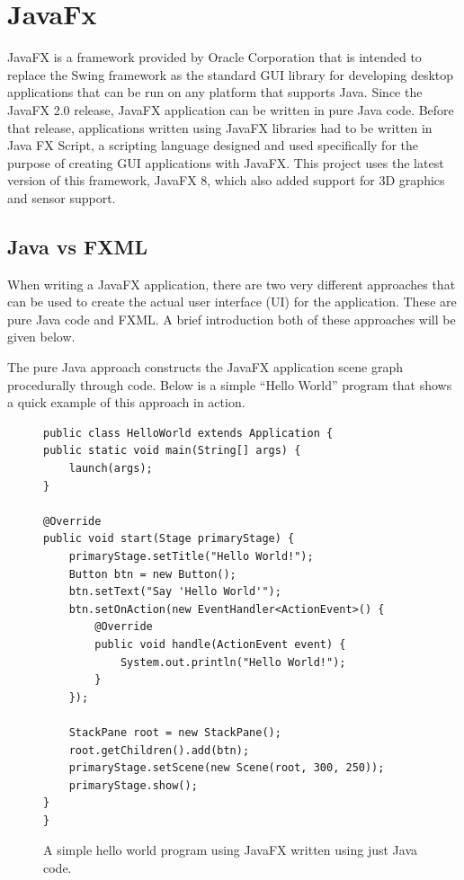 
\section{JavaFx}

JavaFX is a framework provided by Oracle Corporation that is intended to replace the Swing framework as the standard GUI library for developing desktop applications that can be run on any platform that supports Java. Since the JavaFX 2.0 release, JavaFX application can be written in pure Java code. Before that release, applications written using JavaFX libraries had to be written in Java FX Script, a scripting language designed and used specifically for the purpose of creating GUI applications with JavaFX. This project uses the latest version of this framework, JavaFX 8, which also added support for 3D graphics and sensor support. 


\subsection{Java vs FXML}

When writing a JavaFX application, there are two very different approaches that can be used to create the actual user interface (UI) for the application. These are pure Java code and FXML. A brief introduction both of these approaches will be given below. 

The pure Java approach constructs the JavaFX application scene graph procedurally through code. Below is a simple “Hello World” program that shows a quick example of this approach in action.

\begin{figure}[th]
\centering
\begin{lstlisting}
public class HelloWorld extends Application {
public static void main(String[] args) {
	launch(args);
}

@Override
public void start(Stage primaryStage) {
	primaryStage.setTitle("Hello World!");
	Button btn = new Button();
	btn.setText("Say 'Hello World'");
	btn.setOnAction(new EventHandler<ActionEvent>() {
		@Override
		public void handle(ActionEvent event) {
			System.out.println("Hello World!");
		}
	});
	
	StackPane root = new StackPane();
	root.getChildren().add(btn);
	primaryStage.setScene(new Scene(root, 300, 250));
	primaryStage.show();
}
}
\end{lstlisting}
\caption{A simple hello world program using JavaFX written using just Java code.}
\label{fig:helloWorldJavaFX1}
\end{figure}

